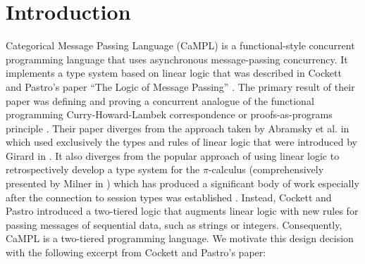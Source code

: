 \documentclass[acmsmall]{acmart}
\begin{document}
\newpage
\setcounter{tocdepth}{3}
\tableofcontents

\section{Introduction}
%
%

Categorical Message Passing Language (CaMPL) is a functional-style concurrent programming language that uses asynchronous message-passing concurrency.
It implements a type system based on linear logic that was described in Cockett and Pastro’s paper ``The Logic of Message Passing'' \cite{CoP07}. The primary result of their paper was defining and proving a concurrent analogue of the functional programming Curry-Howard-Lambek correspondence or proofs-as-programs principle \cite{Howard1980, Lambek1969, Lambek1972}. 
Their paper diverges from the approach taken by Abramsky et al. in 
\cite{ABRAMSKY19933, Abr1993IntCats, Abramsky1999ConcurrentGA, AGN2000} which used exclusively the types and rules of linear logic that were introduced by Girard in \cite{GIRARD19871}.
It also diverges from the popular approach of using linear logic to retrospectively develop a type system for the \(\pi\)-calculus (comprehensively presented by Milner in \cite{Milner1993TheP}) which has produced a significant body of work especially after the connection to session types was established \cite{Honda1993TypesFD, BELLIN199411, Kob96, Barber1997Action, CPf2010, Wa12, CairesPT16, KMP19, AG19, QKB21}.
%
Instead, Cockett and Pastro introduced a two-tiered logic that augments linear logic with new rules for passing messages of sequential data, such as strings or integers.
Consequently, CaMPL is a two-tiered programming language.
We motivate this design decision with the following excerpt from Cockett and Pastro’s paper: 
\end{document}
